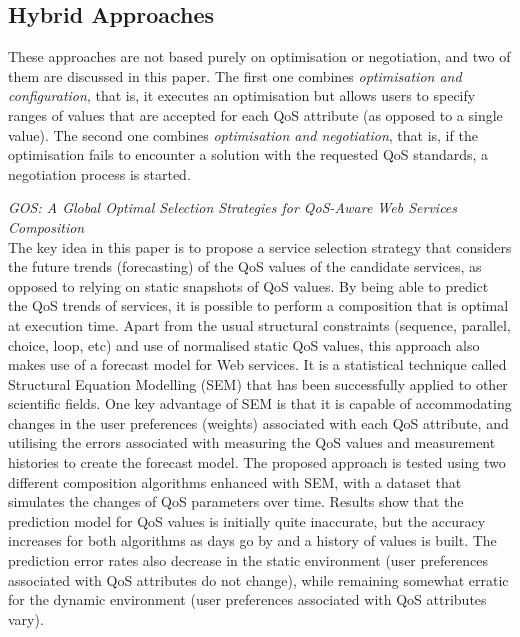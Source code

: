 \subsection{Hybrid Approaches}
These approaches are not based purely on optimisation or negotiation, and two of them are discussed in this paper. The first one combines
\textit{optimisation and configuration}, that is, it executes an optimisation but allows users to specify ranges of values that are accepted for
each QoS attribute (as opposed to a single value). The second one combines \textit{optimisation and negotiation}, that is, if the optimisation
fails to encounter a solution with the requested QoS standards, a negotiation process is started.

\textit{GOS: A Global Optimal Selection Strategies for QoS-Aware Web Services Composition \cite{DBLP:journals/soca/LiZDSGL13}}\\
The key idea in this paper is to propose a service selection strategy that considers the future trends (forecasting) of the QoS values of the candidate
services, as opposed to relying on static snapshots of QoS values. By being able to predict the QoS trends of services, it is possible
to perform a composition that is optimal at execution time. Apart from the usual structural constraints (sequence, parallel, choice, loop,
etc) and use of normalised static QoS values, this approach also makes use of a forecast model for Web services. It is a statistical
technique called Structural Equation Modelling (SEM) that has been successfully applied to other scientific fields. One key advantage
of SEM is that it is capable of accommodating changes in the user preferences (weights) associated with each QoS attribute, and utilising
the errors associated with measuring the QoS values and measurement histories to create the forecast model. The proposed approach is tested using
two different composition algorithms enhanced with SEM, with a dataset that simulates the changes of QoS parameters over time. Results show that the prediction
model for QoS values is initially quite inaccurate, but the accuracy increases for both algorithms as days go by and a history of values is built.
The prediction error rates also decrease in the static environment (user preferences associated with QoS attributes do not change), while remaining
somewhat erratic for the dynamic environment (user preferences associated with QoS attributes vary).

